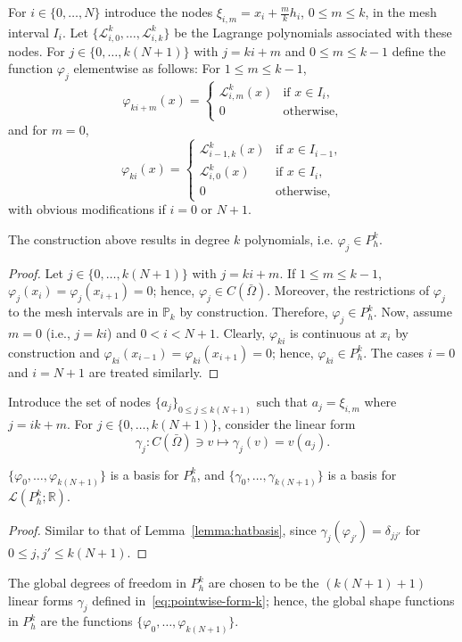 For $i \in \{0, \dots, N\}$ introduce the nodes $\xi_{i,m} = x_i + \frac{m}{k}h_i$, $0 \le m \le k$, in the mesh interval $I_i$. Let $\{\mathcal{L}_{i,0}^k, \dots, \mathcal{L}_{i,k}^k\}$ be the Lagrange polynomials associated with these nodes. For $j \in \{0, \dots, k(N+1)\}$ with $j = ki + m$ and $0 \le m \le k-1$ define the function $\varphi_j$ elementwise as follows: For $1 \le m \le k-1$,
\begin{equation}
    \varphi_{ki+m}(x) = \begin{cases} \mathcal{L}_{i,m}^k(x) & \text{if } x \in I_i, \\ 0 & \text{otherwise}, \end{cases}
\end{equation}
and for $m=0$,
\begin{equation}
    \varphi_{ki}(x) = \begin{cases} \mathcal{L}_{i-1,k}^k(x) & \text{if } x \in I_{i-1}, \\ \mathcal{L}_{i,0}^k(x) & \text{if } x \in I_i, \\ 0 & \text{otherwise}, \end{cases}
\end{equation}
with obvious modifications if $i = 0$ or $N+1$.
\begin{lemma}\label{lemma:basis_functions_Pk}
    The construction above results in degree $k$ polynomials, i.e. $\varphi_j \in P_h^k$.
    \begin{proof}
        Let $j \in \{0, \dots, k(N+1)\}$ with $j = ki + m.$ If $1 \le m \le k-1$, $\varphi_j(x_i) = \varphi_j(x_{i+1}) = 0$; hence, $\varphi_j \in C(\bar{\Omega})$. Moreover, the restrictions of $\varphi_j$ to the mesh intervals are in $\mathbb{P}_k$ by construction. Therefore, $\varphi_j \in P_h^k$. Now, assume $m = 0$ (i.e., $j=ki$) and $0 < i < N+1$. Clearly, $\varphi_{ki}$ is continuous at $x_i$ by construction and $\varphi_{ki}(x_{i-1}) = \varphi_{ki}(x_{i+1}) = 0$; hence, $\varphi_{ki} \in P_h^k$. The cases $i = 0$ and $i = N+1$ are treated similarly.
    \end{proof}
\end{lemma}
Introduce the set of nodes $\{a_j\}_{0 \le j \le k(N+1)}$ such that $a_j = \xi_{i,m}$ where $j = ik + m$. For $j \in \{0, \dots, k(N+1)\}$, consider the linear form
\begin{equation}\label{eq:pointwise-form-k}
    \gamma_j: C(\bar{\Omega}) \ni v \mapsto \gamma_j(v) = v(a_j).
\end{equation}
\begin{lemma}
    $\{\varphi_0, \dots, \varphi_{k(N+1)}\}$ is a basis for $P_h^k$, and $\{\gamma_0, \dots, \gamma_{k(N+1)}\}$ is a basis for $\mathcal{L}(P_h^k; \mathbb{R})$.
    \begin{proof}
        Similar to that of Lemma~\ref{lemma:hatbasis}, since $\gamma_j(\varphi_{j'}) = \delta_{jj'}$ for $0 \le j,j' \le k(N+1)$.
    \end{proof}
\end{lemma}
The global degrees of freedom in $P_h^k$ are chosen to be the $(k(N+1)+1)$ linear forms $\gamma_j$ defined in~\eqref{eq:pointwise-form-k}; hence, the global shape functions in $P_h^k$ are the functions $\{\varphi_0, \dots, \varphi_{k(N+1)}\}$.

